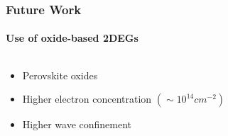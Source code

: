 \documentclass[mathserif,18pt,xcolor=table]{beamer}
\begin{document}
\begin{frame}
  \frametitle{Future Work}
  \framesubtitle{Use of oxide-based 2DEGs}
  \begin{columns}[T] %
    \begin{column}{.5\textwidth}
      \begin{itemize}
        \item Perovskite oxides
        \item Higher electron concentration $( \sim 10^{14} cm^{-2})$
        \item Higher wave confinement
      \end{itemize}
    \end{column}
    \begin{column}[T]{.5\textwidth}
      \begin{figure}
        \vspace*{-2cm}
        \subfloat{
        \label{fig:eps_Ga}}
        \vspace*{0cm}
      \end{figure}
      \end{column}%
    \end{columns}
  \end{frame}
\end{document}
